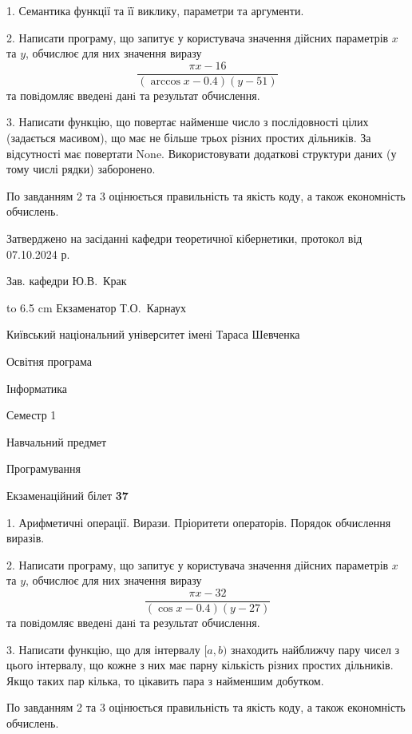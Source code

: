 \documentclass[12pt, ukrainian]{article}
\begin{document}
{%
1. Семантика функції та її виклику, параметри та аргументи.%
\par
2. Написати програму, що запитує у користувача значення дійсних параметрів $x$ та $y$, обчислює для них значення виразу 
$$\frac{\pi x - 16}{(\arccos x - 0.4) (y - 51)}$$ 
та повiдомляє введенi данi та результат обчислення.

\par
3. Написати функцію, що повертає найменше число з послідовності цілих (задається масивом), що має не більше трьох різних простих дільників. За відсутності має повертати None. Використовувати додаткові структури даних (у тому числі рядки) заборонено.

По завданням 2 та 3 оцінюється правильність та якість коду, а також економність обчислень.

}
{\smallskip\smallskip \begin {scriptsize} Затверджено на засіданні кафедри теоретичної кібернетики, протокол   від   07.10.2024 р.\par\smallskip\smallskip\smallskip\smallskip
{\parbox {6.5 cm} {Зав. кафедри \dotfill Ю.В.~Крак}}\hspace {0.7cm} {\hbox to 6.5 cm { Екзаменатор \dotfill Т.О.~Карнаух}} \end{scriptsize}}
\newpage
{{\begin {scriptsize}\par
{ \center  Київський національний університет імені Тараса Шевченка \par}
{\parbox {5 cm}{Освітня програма \hfill}{\parbox {7 cm}{Інформатика\hfill}}\parbox {6 cm}{\hfill Семестр 1}}\par
{\parbox {5 cm} {Навчальний предмет \hfill}\parbox {7 cm}{Програмування \hfill}\parbox {6cm}{\hfill}\par}\vspace{-15pt} \end{scriptsize}}{\center Екзаменаційний білет \No \textbf { 37 }\par}}
{%
1. Арифметичні операції. Вирази. Пріоритети операторів. Порядок обчислення виразів.%
\par
2. Написати програму, що запитує у користувача значення дійсних параметрів $x$ та $y$, обчислює для них значення виразу 
$$\frac{\pi x - 32}{(\cos x - 0.4) (y - 27)}$$ 
та повiдомляє введенi данi та результат обчислення.

\par
3. Написати функцію, що для інтервалу $[a, b)$ знаходить найближчу пару чисел з цього інтервалу, що кожне з них має парну кількість різних простих дільників. Якщо таких пар кілька, то цікавить пара з найменшим добутком.

По завданням 2 та 3 оцінюється правильність та якість коду, а також економність обчислень.

}
\end{document}
